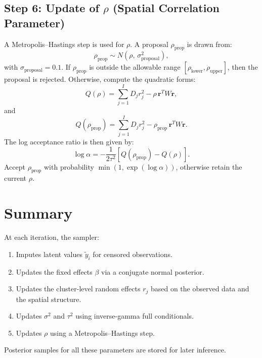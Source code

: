 \documentclass{article}
\begin{document}
\subsection*{Step 6: Update of $\rho$ (Spatial Correlation Parameter)}
A Metropolis--Hastings step is used for $\rho$. A proposal $\rho_{\text{prop}}$ is drawn from:
\[
\rho_{\text{prop}} \sim N(\rho, \, \sigma_{\text{proposal}}^2),
\]
with $\sigma_{\text{proposal}} = 0.1$. If $\rho_{\text{prop}}$ is outside the allowable range $[\rho_{\text{lower}},\rho_{\text{upper}}]$, then the proposal is rejected. Otherwise, compute the quadratic forms:
\[
Q(\rho) = \sum_{j=1}^{I} D_j r_j^2 - \rho \, \mathbf{r}^T W \mathbf{r},
\]
and
\[
Q(\rho_{\text{prop}}) = \sum_{j=1}^{I} D_j r_j^2 - \rho_{\text{prop}} \, \mathbf{r}^T W \mathbf{r}.
\]
The log acceptance ratio is then given by:
\[
\log \alpha = -\frac{1}{2 \tau^2} \left[ Q(\rho_{\text{prop}}) - Q(\rho) \right].
\]
Accept $\rho_{\text{prop}}$ with probability $\min(1, \exp(\log \alpha))$, otherwise retain the current $\rho$.

\section*{Summary}
At each iteration, the sampler:
\begin{enumerate}
    \item Imputes latent values $\tilde{y}_i$ for censored observations.
    \item Updates the fixed effects $\beta$ via a conjugate normal posterior.
    \item Updates the cluster-level random effects $r_j$ based on the observed data and the spatial structure.
    \item Updates $\sigma^2$ and $\tau^2$ using inverse-gamma full conditionals.
    \item Updates $\rho$ using a Metropolis--Hastings step.
\end{enumerate}
Posterior samples for all these parameters are stored for later inference.
\end{document}
